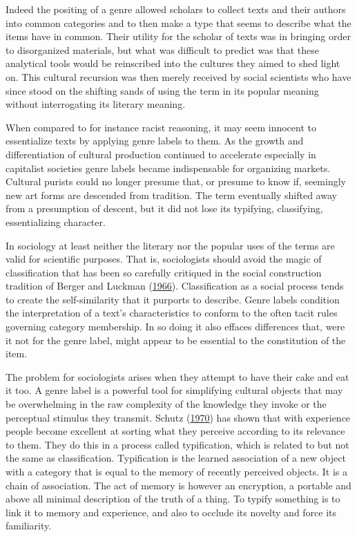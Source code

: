 \documentclass[]{book}
\theoremstyle{definition}
\theoremstyle{definition}
\theoremstyle{definition}
\theoremstyle{remark}
\begin{document}
Indeed the positing of a genre allowed scholars to collect texts and
their authors into common categories and to then make a type that seems
to describe what the items have in common. Their utility for the scholar
of texts was in bringing order to disorganized materials, but what was
difficult to predict was that these analytical tools would be
reinscribed into the cultures they aimed to shed light on. This cultural
recursion was then merely received by social scientists who have since
stood on the shifting sands of using the term in its popular meaning
without interrogating its literary meaning.

When compared to for instance racist reasoning, it may seem innocent to
essentialize texts by applying genre labels to them. As the growth and
differentiation of cultural production continued to accelerate
especially in capitalist societies genre labels became indispensable for
organizing markets. Cultural purists could no longer presume that, or
presume to know if, seemingly new art forms are descended from
tradition. The term eventually shifted away from a presumption of
descent, but it did not lose its typifying, classifying, essentializing
character.

In sociology at least neither the literary nor the popular uses of the
terms are valid for scientific purposes. That is, sociologists should
avoid the magic of classification that has been so carefully critiqued
in the social construction tradition of Berger and Luckman
(\protect\hyperlink{ref-Berger1966Social}{1966}). Classification as a
social process tends to create the self-similarity that it purports to
describe. Genre labels condition the interpretation of a text's
characteristics to conform to the often tacit rules governing category
membership. In so doing it also effaces differences that, were it not
for the genre label, might appear to be essential to the constitution of
the item.

The problem for sociologists arises when they attempt to have their cake
and eat it too. A genre label is a powerful tool for simplifying
cultural objects that may be overwhelming in the raw complexity of the
knowledge they invoke or the perceptual stimulus they transmit. Schutz
(\protect\hyperlink{ref-Schutz1970Reflections}{1970}) has shown that
with experience people become excellent at sorting what they perceive
according to its relevance to them. They do this in a process called
typification, which is related to but not the same as classification.
Typification is the learned association of a new object with a category
that is equal to the memory of recently perceived objects. It is a chain
of association. The act of memory is however an encryption, a portable
and above all minimal description of the truth of a thing. To typify
something is to link it to memory and experience, and also to occlude
its novelty and force its familiarity.
\end{document}
